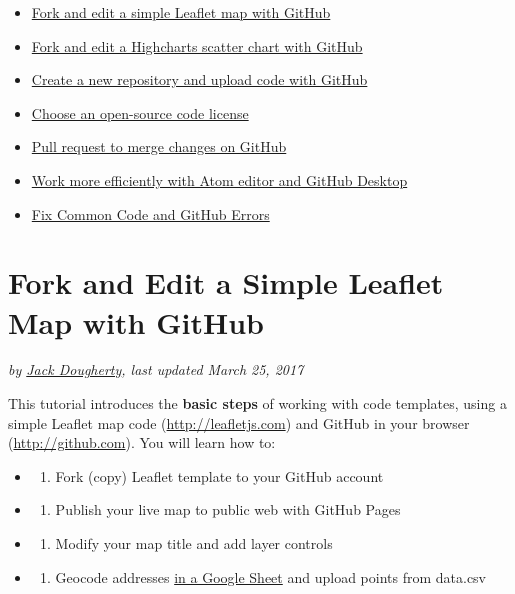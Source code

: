 \documentclass[
  english,
]{book}
\providecommand{\tightlist}{%
  \setlength{\itemsep}{0pt}\setlength{\parskip}{0pt}}
\begin{document}
\begin{itemize}
\tightlist
\item
  \href{fork-leaflet}{Fork and edit a simple Leaflet map with GitHub}
\item
  \href{fork-highcharts}{Fork and edit a Highcharts scatter chart with GitHub}
\item
  \href{create-repo}{Create a new repository and upload code with GitHub}
\item
  \href{choose-license}{Choose an open-source code license}
\item
  \href{pull-request}{Pull request to merge changes on GitHub}
\item
  \href{atom-desktop}{Work more efficiently with Atom editor and GitHub Desktop}
\item
  \href{fix-code}{Fix Common Code and GitHub Errors}
\end{itemize}

\hypertarget{fork-leaflet}{%
\section{Fork and Edit a Simple Leaflet Map with GitHub}\label{fork-leaflet}}

\emph{by \href{authors}{Jack Dougherty}, last updated March 25, 2017}

This tutorial introduces the \textbf{basic steps} of working with code templates, using a simple Leaflet map code (\url{http://leafletjs.com}) and GitHub in your browser (\url{http://github.com}). You will learn how to:

\begin{itemize}
\item
  \begin{enumerate}
  \def\labelenumi{\Alph{enumi})}
  \tightlist
  \item
    Fork (copy) Leaflet template to your GitHub account
  \end{enumerate}
\item
  \begin{enumerate}
  \def\labelenumi{\Alph{enumi})}
  \setcounter{enumi}{1}
  \tightlist
  \item
    Publish your live map to public web with GitHub Pages
  \end{enumerate}
\item
  \begin{enumerate}
  \def\labelenumi{\Alph{enumi})}
  \setcounter{enumi}{2}
  \tightlist
  \item
    Modify your map title and add layer controls
  \end{enumerate}
\item
  \begin{enumerate}
  \def\labelenumi{\Alph{enumi})}
  \setcounter{enumi}{3}
  \tightlist
  \item
    Geocode addresses \href{https://docs.google.com/spreadsheets/d/1z_0hKbw8Ff_fdp-XRoRL4YWe6ue0c0EpITveZ2rz1e8/}{in a Google Sheet} and upload points from data.csv
  \end{enumerate}
\end{itemize}
\end{document}
